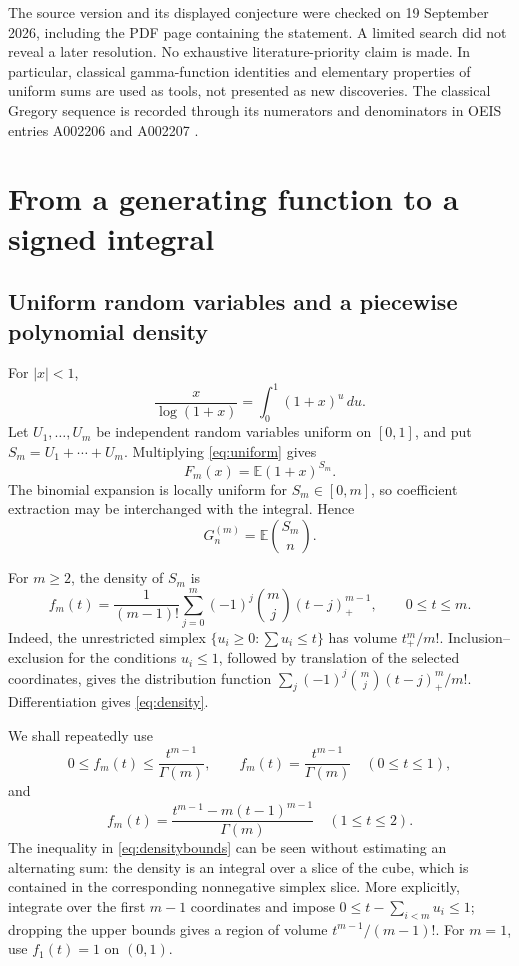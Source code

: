 \documentclass[11pt]{article}
\numberwithin{equation}{section}
\theoremstyle{definition}
\newcommand{\E}{\mathbb E}
\begin{document}
The source version and its displayed conjecture were checked on
19 September 2026, including the PDF page containing the statement. A
limited search did not reveal a later resolution. No exhaustive
literature-priority claim is made. In particular, classical gamma-function
identities and elementary properties of uniform sums are used as tools,
not presented as new discoveries. The classical Gregory sequence is
recorded through its numerators and denominators in OEIS entries A002206
and A002207 \cite{OEIS206,OEIS207}.

\section{From a generating function to a signed integral}\label{sec:integral}

\subsection{Uniform random variables and a piecewise polynomial density}
For $|x|<1$,
\begin{equation}\label{eq:uniform}
 \frac{x}{\log(1+x)}=\int_0^1(1+x)^u\,du.
\end{equation}
Let $U_1,\ldots,U_m$ be independent random variables uniform on $[0,1]$,
and put $S_m=U_1+\cdots+U_m$. Multiplying \eqref{eq:uniform} gives
\[
 F_m(x)=\E(1+x)^{S_m}.
\]
The binomial expansion is locally uniform for $S_m\in[0,m]$, so coefficient
extraction may be interchanged with the integral. Hence
\begin{equation}\label{eq:binomial_expectation}
 G_n^{(m)}=\E\binom{S_m}{n}.
\end{equation}

For $m\ge2$, the density of $S_m$ is
\begin{equation}\label{eq:density}
 f_m(t)=\frac{1}{(m-1)!}\sum_{j=0}^{m}(-1)^j\binom mj
                    (t-j)_+^{m-1},\qquad 0\le t\le m.
\end{equation}
Indeed, the unrestricted simplex
$\{u_i\ge0:\sum u_i\le t\}$ has volume $t_+^m/m!$.
Inclusion--exclusion for the conditions $u_i\le1$, followed by translation
of the selected coordinates, gives the distribution function
$\sum_j(-1)^j\binom mj(t-j)_+^m/m!$. Differentiation gives
\eqref{eq:density}.

We shall repeatedly use
\begin{equation}\label{eq:densitybounds}
 0\le f_m(t)\le\frac{t^{m-1}}{\Gamma(m)},\qquad
 f_m(t)=\frac{t^{m-1}}{\Gamma(m)}\quad(0\le t\le1),
\end{equation}
and
\begin{equation}\label{eq:density12}
 f_m(t)=\frac{t^{m-1}-m(t-1)^{m-1}}{\Gamma(m)}
                       \quad(1\le t\le2).
\end{equation}
The inequality in \eqref{eq:densitybounds} can be seen without estimating
an alternating sum: the density is an integral over a slice of the cube,
which is contained in the corresponding nonnegative simplex slice. More
explicitly, integrate over the first $m-1$ coordinates and impose
$0\le t-\sum_{i<m}u_i\le1$; dropping the upper bounds gives a region of
volume $t^{m-1}/(m-1)!$. For $m=1$, use $f_1(t)=1$ on $(0,1)$.
\end{document}
